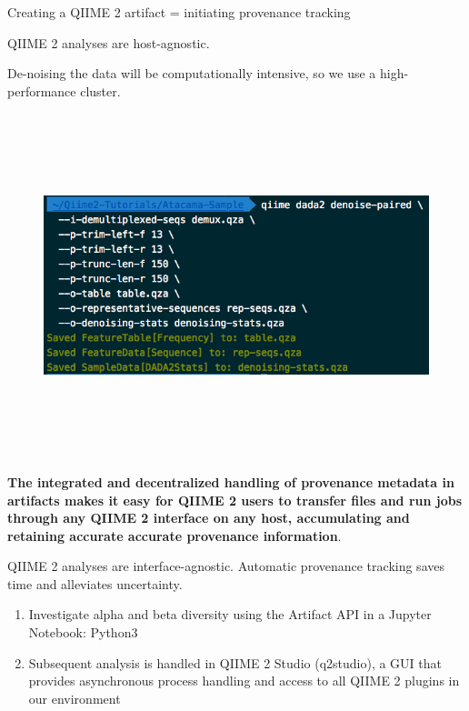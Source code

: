 \documentclass[final]{beamer}
\newlength{\colwidth}
\begin{document}
\begin{frame}[t]
\begin{columns}[t]
\begin{column}{\colwidth}
\begin{block}{Creating a QIIME 2 artifact = initiating provenance tracking}
  \end{block}

  \begin{block}{QIIME 2 analyses are host-agnostic.}

    De-noising the data will be computationally intensive, so we use a
    high-performance cluster.
    \begin{figure}[tph!]
      {\includegraphics[width=25cm,height=10cm]{assets/dada2}}
    \end{figure}

    \textbf{The integrated and decentralized handling of provenance metadata in
    artifacts makes it easy for QIIME 2 users to transfer files and run jobs
    through any QIIME 2 interface on any host, accumulating and retaining
    accurate accurate provenance information}.

  \end{block}

  \begin{block}{QIIME 2 analyses are interface-agnostic. Automatic provenance tracking saves time and alleviates uncertainty.}

    \begin{enumerate}
      \item Investigate alpha and beta diversity using the Artifact API in
      a Jupyter Notebook\cite{PER-GRA:2007}: Python3
      \item Subsequent analysis is handled in QIIME 2 Studio (q2studio), a GUI
      that provides asynchronous process handling and access to all
      QIIME 2 plugins in our environment
    \end{enumerate}


\end{block}
\end{column}
\end{columns}
\end{frame}
\end{document}
